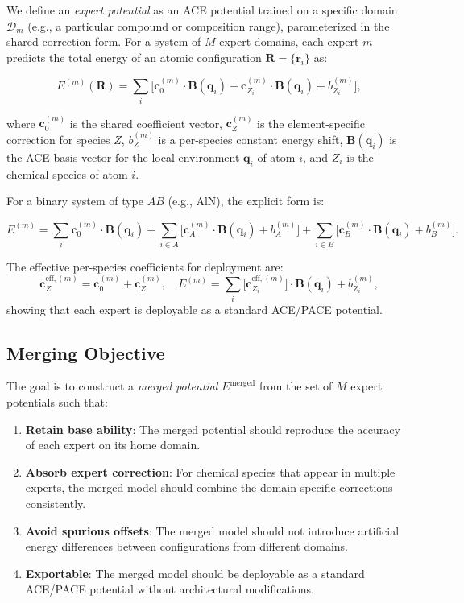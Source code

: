 \documentclass[twoside,prb,aps,floatfix,superscriptaddress,longbibliography]{revtex4-2}
\newcommand{\cZ}{\mathbf{c}_{Z}}
\newcommand{\cA}{\mathbf{c}_{A}}
\newcommand{\cB}{\mathbf{c}_{B}}
\newcommand{\cb}{\mathbf{c}_{0}}
\begin{document}
We define an \emph{expert potential} as an ACE potential trained on a specific domain $\mathcal{D}_m$ (e.g., a particular compound or composition range), parameterized in the shared-correction form. For a system of $M$ expert domains, each expert $m$ predicts the total energy of an atomic configuration $\mathbf{R} = \{\mathbf{r}_i\}$ as:

\begin{equation}
E^{(m)}(\mathbf{R}) = \sum_i \Big[ \cb^{(m)} \cdot \mathbf{B}(\mathbf{q}_i) + \mathbf{c}_{Z_i}^{(m)} \cdot \mathbf{B}(\mathbf{q}_i) + b_{Z_i}^{(m)} \Big],
\label{eq:expert_ace}
\end{equation}

where $\cb^{(m)}$ is the shared coefficient vector, $\cZ^{(m)}$ is the element-specific correction for species $Z$, $b_Z^{(m)}$ is a per-species constant energy shift, $\mathbf{B}(\mathbf{q}_i)$ is the ACE basis vector for the local environment $\mathbf{q}_i$ of atom $i$, and $Z_i$ is the chemical species of atom $i$.

For a binary system of type $AB$ (e.g., AlN), the explicit form is:

\begin{equation}
E^{(m)} = \sum_i \cb^{(m)} \cdot \mathbf{B}(\mathbf{q}_i) + \sum_{i \in A} \big[ \cA^{(m)} \cdot \mathbf{B}(\mathbf{q}_i) + b_A^{(m)} \big] + \sum_{i \in B} \big[ \cB^{(m)} \cdot \mathbf{B}(\mathbf{q}_i) + b_B^{(m)} \big].
\label{eq:expert_binary}
\end{equation}

The effective per-species coefficients for deployment are:
\begin{equation}
\cZ^{\mathrm{eff},(m)} = \cb^{(m)} + \cZ^{(m)},
\quad
E^{(m)} = \sum_i \big[ \mathbf{c}_{Z_i}^{\mathrm{eff},(m)} \big] \cdot \mathbf{B}(\mathbf{q}_i) + b_{Z_i}^{(m)},
\label{eq:expert_effective}
\end{equation}
showing that each expert is deployable as a standard ACE/PACE potential.

\subsection{Merging Objective}

The goal is to construct a \emph{merged potential} $E^{\mathrm{merged}}$ from the set of $M$ expert potentials such that:

\begin{enumerate}[label=\textbf{(G\arabic*)}]
    \item \textbf{Retain base ability}: The merged potential should reproduce the accuracy of each expert on its home domain.
    \item \textbf{Absorb expert correction}: For chemical species that appear in multiple experts, the merged model should combine the domain-specific corrections consistently.
    \item \textbf{Avoid spurious offsets}: The merged model should not introduce artificial energy differences between configurations from different domains.
    \item \textbf{Exportable}: The merged model should be deployable as a standard ACE/PACE potential without architectural modifications.
\end{enumerate}
\end{document}
